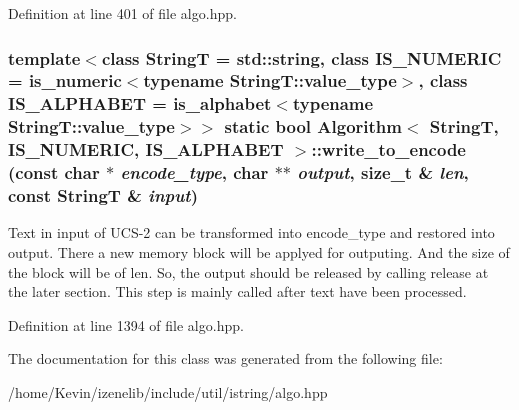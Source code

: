 Definition at line 401 of file algo.hpp.\hypertarget{classAlgorithm_71b0e9191bc505859f1b6d4d50cb9a16}{
\subsubsection[{write\_\-to\_\-encode}]{\setlength{\rightskip}{0pt plus 5cm}template$<$class StringT  = std::string, class IS\_\-NUMERIC  = is\_\-numeric$<$typename StringT::value\_\-type$>$, class IS\_\-ALPHABET  = is\_\-alphabet$<$typename StringT::value\_\-type$>$$>$ static bool {\bf Algorithm}$<$ StringT, IS\_\-NUMERIC, IS\_\-ALPHABET $>$::write\_\-to\_\-encode (const char $\ast$ {\em encode\_\-type}, \/  char $\ast$$\ast$ {\em output}, \/  size\_\-t \& {\em len}, \/  const StringT \& {\em input})}}
\label{classAlgorithm_71b0e9191bc505859f1b6d4d50cb9a16}


Text in input of UCS-2 can be transformed into encode\_\-type and restored into output. There a new memory block will be applyed for outputing. And the size of the block will be of len. So, the output should be released by calling release at the later section. This step is mainly called after text have been processed. 

Definition at line 1394 of file algo.hpp.

The documentation for this class was generated from the following file:\begin{CompactItemize}
\item 
/home/Kevin/izenelib/include/util/istring/algo.hpp\end{CompactItemize}

